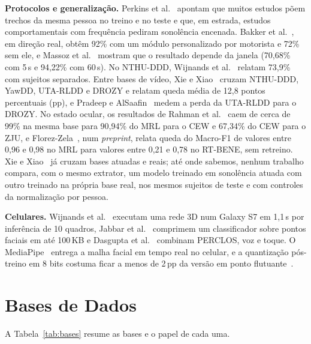 \documentclass[conference]{IEEEtran}
\begin{document}
\textbf{Protocolos e generalização.} Perkins et al.~\cite{perkins2023} apontam que muitos estudos põem trechos da mesma pessoa no treino e no teste e que, em estrada, estudos comportamentais com frequência pediram sonolência encenada. Bakker et al.~\cite{bakker2022}, em direção real, obtêm 92\% com um módulo personalizado por motorista e 72\% sem ele, e Massoz et al.~\cite{massoz2018} mostram que o resultado depende da janela (70,68\% com 5\,s e 94,22\% com 60\,s). No NTHU-DDD, Wijnands et al.~\cite{wijnands2020} relatam 73,9\% com sujeitos separados. Entre bases de vídeo, Xie e Xiao~\cite{xie2026} cruzam NTHU-DDD, YawDD, UTA-RLDD e DROZY e relatam queda média de 12,8 pontos percentuais (pp), e Pradeep e AlSaafin~\cite{pradeep2026} medem a perda da UTA-RLDD para o DROZY. No estado ocular, os resultados de Rahman et al.~\cite{rahman2020} caem de cerca de 99\% na mesma base para 90,94\% do MRL para o CEW e 67,34\% do CEW para o ZJU, e Florez-Zela~\cite{florez2026}, num \emph{preprint}, relata queda do Macro-F1 de valores entre 0,96 e 0,98 no MRL para valores entre 0,21 e 0,78 no RT-BENE, sem retreino. Xie e Xiao~\cite{xie2026} já cruzam bases atuadas e reais; até onde sabemos, nenhum trabalho compara, com o mesmo extrator, um modelo treinado em sonolência atuada com outro treinado na própria base real, nos mesmos sujeitos de teste e com controles da normalização por pessoa.

\textbf{Celulares.} Wijnands et al.~\cite{wijnands2020} executam uma rede 3D num Galaxy S7 em 1,1\,s por inferência de 10 quadros, Jabbar et al.~\cite{jabbar2018} comprimem um classificador sobre pontos faciais em até 100\,KB e Dasgupta et al.~\cite{dasgupta2019} combinam PERCLOS, voz e toque. O MediaPipe~\cite{lugaresi2019,kartynnik2019} entrega a malha facial em tempo real no celular, e a quantização pós-treino em 8 bits costuma ficar a menos de 2\,pp da versão em ponto flutuante~\cite{krishnamoorthi2018}.

\section{Bases de Dados}
\label{sec:bases}

A Tabela~\ref{tab:bases} resume as bases e o papel de cada uma.
\end{document}
